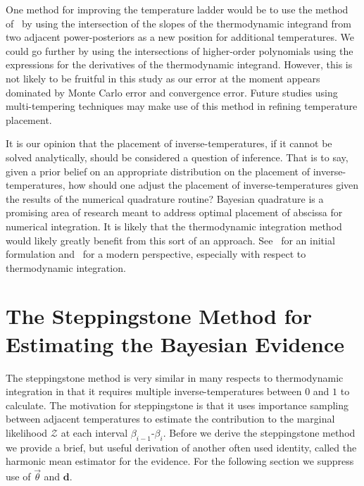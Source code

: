 One method for improving the temperature ladder would be to use the method of~\cite{friel2014improving} by using the intersection of the slopes of the thermodynamic integrand from two adjacent power-posteriors as a new position for additional temperatures. We could go further by using the intersections of higher-order polynomials using the expressions for the derivatives of the thermodynamic integrand. However, this is not likely to be fruitful in this study as our error at the moment appears dominated by Monte Carlo error and convergence error. Future studies using multi-tempering techniques may make use of this method in refining temperature placement.

It is our opinion that the placement of inverse-temperatures, if it cannot be solved analytically, should be considered a question of inference. That is to say, given a prior belief on an appropriate distribution on the placement of inverse-temperatures, how should one adjust the placement of inverse-temperatures given the results of the numerical quadrature routine? Bayesian quadrature is a promising area of research meant to address optimal placement of abscissa for numerical integration. It is likely that the thermodynamic integration method would likely greatly benefit from this sort of an approach. See~\cite{diaconis1988bayesian} for an initial formulation and~\cite{briol2015probabilistic} for a modern perspective, especially with respect to thermodynamic integration.

\section{The Steppingstone Method for Estimating the Bayesian Evidence}
The steppingstone method is very similar in many respects to thermodynamic integration in that it requires multiple inverse-temperatures between $0$ and $1$ to calculate. The motivation for steppingstone is that it uses importance sampling between adjacent temperatures to estimate the contribution to the marginal likelihood $\mathcal{Z}$ at each interval $\beta_{i-1}$-$\beta_i$. Before we derive the steppingstone method we provide a brief, but useful derivation of another often used identity, called the harmonic mean estimator for the evidence. For the following section we suppress use of $\vec{\theta}$ and $\mathbf{d}$.

